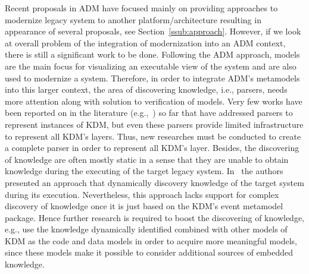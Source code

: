 Recent proposals in ADM have focused mainly on providing approaches to modernize legacy system to another platform/architecture resulting in appearance of several proposals, see Section~\ref{ssub:approach}. However, if we look at overall problem of the integration of modernization into an ADM context, there is still a significant work to be done. Following the ADM approach, models are the main focus for visualizing an executable view of the system and are also used to modernize a system. Therefore, in order to integrate ADM's metamodels into this larger context, the area of discovering knowledge, i.e., parsers, needs more attention along with solution to verification of models. Very few works have been reported on in the literature (e.g.,~\cite{5440163,Bruneliere:2010:MGE:1858996.1859032}) so far that have addressed parsers to represent instances of KDM, but even these parsers provide limited infrastructure to represent all KDM's layers. Thus, new researches must be conducted to create a complete parser in order to represent all KDM's layer. Besides, the discovering of knowledge are often mostly static in a sense that they are unable to obtain knowledge during the executing of the target legacy system. In~\cite{5871783} the authors presented an approach that dynamically discovery knowledge of the target system during its execution. Nevertheless, this approach lacks support for complex discovery of knowledge once it is just based on the KDM's event metamodel package. Hence further research is required to boost the discovering of knowledge, e.g., use the knowledge dynamically identified combined with other models of KDM as the code and data models in order to acquire more meaningful models, since these models make it possible to consider additional sources of embedded knowledge.

